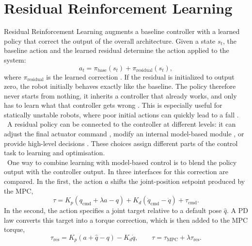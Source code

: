 \section{Residual Reinforcement Learning}

Residual Reinforcement Learning augments a baseline controller with a learned
policy that correct the output of the overall architecture. Given a state \(s_t\), the
baseline action and the learned residual determine the action applied to the
system:
%
\begin{equation}
    a_t =
    \pi_{\mathrm{base}}(s_t) + \pi_{\mathrm{residual}}(s_t),
    \label{eq:residual_policy}
\end{equation}
%
where \(\pi_{\mathrm{residual}}\) is the learned correction
\cite{residual_policy,residual_robot_control}. If the residual is initialized
to output zero, the robot initially behaves exactly like the baseline. The
policy therefore never starts from nothing, it inherits a controller that
already works, and only has to learn what that controller
gets wrong \cite{residual_policy}. This is especially useful for statically unstable
robots, where poor initial actions can quickly lead to a fall
\cite{hybrid_balance}.\\
\
A residual policy can be connected to the controller at
different levels: it can adjust the final actuator command
\cite{residual_mpc,hybrid_balance}, modify an internal model-based module
\cite{modular_residual,model_gap}, or provide high-level
decisions \cite{non_gaited}. These choices
assign different parts of the control task to learning and optimisation.\\
\
One way to combine learning with model-based control is to blend the policy
output with the controller output. In \cite{residual_mpc} three interfaces
for this correction are compared. In the first, the action \(a\) shifts
the joint-position setpoint produced by the MPC,
%
\begin{equation}
    \tau = K_p\left(q_{\mathrm{cmd}} + \lambda a - q\right)
    + K_d\left(\dot{q}_{\mathrm{cmd}} - \dot{q}\right) + \tau_{\mathrm{cmd}}.
    \label{eq:blend_joint_joint}
\end{equation}
%
In the second, the action specifies a joint target relative to a default pose
\(\hat{q}\). A PD law converts this target into a torque correction, which is
then added to the MPC torque,
%
\begin{equation}
    \tau_{\mathrm{res}} = K_p\left(a + \hat{q} - q\right) - K_d \dot{q},
    \qquad
    \tau = \tau_{\mathrm{MPC}} + \lambda \tau_{\mathrm{res}}.
    \label{eq:blend_joint_torque}
\end{equation}
